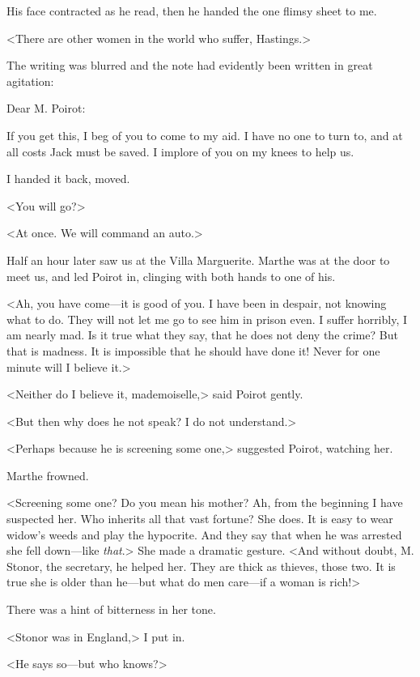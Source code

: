  His face contracted as he read, then he handed the one flimsy sheet to me. 

 <There are other women in the world who suffer, Hastings.> 

 The writing was blurred and the note had evidently been written in great agitation: 
 
 \begin{mail}{}{Dear M. Poirot:}
 
 If you get this, I beg of you to come to my aid. I have no one to turn to, and at all costs Jack must be saved. I implore of you on my knees to help us. 
\end{mail}

 I handed it back, moved. 

 <You will go?> 

 <At once. We will command an auto.> 

 Half an hour later saw us at the Villa Marguerite. Marthe was at the door to meet us, and led Poirot in, clinging with both hands to one of his. 

 <Ah, you have come—it is good of you. I have been in despair, not knowing what to do. They will not let me go to see him in prison even. I suffer horribly, I am nearly mad. Is it true what they say, that he does not deny the crime? But that is madness. It is impossible that he should have done it! Never for one minute will I believe it.> 

 <Neither do I believe it, mademoiselle,> said Poirot gently. 

 <But then why does he not speak? I do not understand.> 

 <Perhaps because he is screening some one,> suggested Poirot, watching her. 

 Marthe frowned. 

 <Screening some one? Do you mean his mother? Ah, from the beginning I have suspected her. Who inherits all that vast fortune? She does. It is easy to wear widow's weeds and play the hypocrite. And they say that when he was arrested she fell down—like \emph{that}.> She made a dramatic gesture. <And without doubt, M. Stonor, the secretary, he helped her. They are thick as thieves, those two. It is true she is older than he—but what do men care—if a woman is rich!> 

 There was a hint of bitterness in her tone. 

 <Stonor was in England,> I put in. 

 <He says so—but who knows?> 

